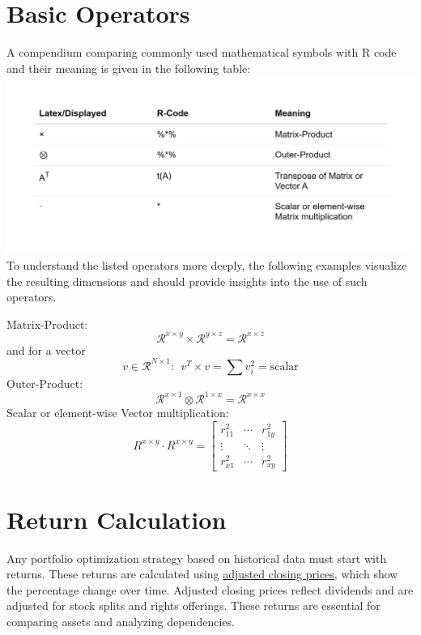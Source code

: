 \documentclass[
  oneside]{book}
\begin{document}
\hypertarget{basic-operators}{%
\section{Basic Operators}\label{basic-operators}}

A compendium comparing commonly used mathematical symbols with R code and their meaning is given in the following table:\\
\includegraphics{Master_Thesis_files/figure-latex/operators-1.png}
To understand the listed operators more deeply, the following examples visualize the resulting dimensions and should provide insights into the use of such operators.

Matrix-Product:
\[\mathcal{R}^{x \times y} \times \mathcal{R}^{y \times z} = \mathcal{R}^{x \times z} \]
and for a vector
\[v \in \mathcal{R}^{N \times 1}: \ \ v^T \times v = \sum v_i^2 = \text{scalar}\]
Outer-Product:
\[\mathcal{R}^{x \times 1} \otimes \mathcal{R}^{1 \times x} = \mathcal{R}^{x \times x} \]
Scalar or element-wise Vector multiplication:
\[R^{x \times y} \cdot R^{x \times y} = \begin{bmatrix}r_{11}^2 &\cdots  & r_{1y}^2 \\ \vdots & \ddots & \vdots  \\ r_{x1}^2 & \cdots & r_{xy}^2 \end{bmatrix}\]

\hypertarget{return-calculation}{%
\section{Return Calculation}\label{return-calculation}}

Any portfolio optimization strategy based on historical data must start with returns. These returns are calculated using \href{https://www.investopedia.com/terms/a/adjusted\%20closingprice.asp}{adjusted closing prices}, which show the percentage change over time. Adjusted closing prices reflect dividends and are adjusted for stock splits and rights offerings. These returns are essential for comparing assets and analyzing dependencies.
\end{document}
